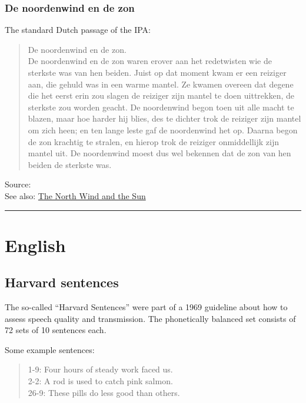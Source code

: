 \documentclass[
]{book}
\begin{document}
\subsubsection{De noordenwind en de zon}\label{de-noordenwind-en-de-zon}

The standard Dutch passage of the IPA:

\begin{quote}
De noordenwind en de zon.\\
De noordenwind en de zon waren erover aan het redetwisten wie de sterkste was van hen beiden.
Juist op dat moment kwam er een reiziger aan, die gehuld was in een warme mantel.
Ze kwamen overeen dat degene die het eerst erin zou slagen de reiziger zijn mantel te doen uittrekken, de sterkste zou worden geacht.
De noordenwind begon toen uit alle macht te blazen, maar hoe harder hij blies, des te dichter trok de reiziger zijn mantel om zich heen; en ten lange leste gaf de noordenwind het op.
Daarna begon de zon krachtig te stralen, en hierop trok de reiziger onmiddellijk zijn mantel uit.
De noordenwind moest dus wel bekennen dat de zon van hen beiden de sterkste was.
\end{quote}

Source: \citet{HandbookIPA_1999}\\
See also: \href{https://en.wikipedia.org/wiki/The_North_Wind_and_the_Sun}{The North Wind and the Sun}

\begin{center}\rule{0.5\linewidth}{0.5pt}\end{center}

\section{English}\label{english}

\subsection{Harvard sentences}\label{harvard-sentences}

The so-called ``Harvard Sentences'' were part of a 1969 guideline about how to assess speech quality and transmission. The phonetically balanced set consists of 72 sets of 10 sentences each.

Some example sentences:

\begin{quote}
1-9: Four hours of steady work faced us.\\
2-2: A rod is used to catch pink salmon.\\
26-9: These pills do less good than others.
\end{quote}
\end{document}

